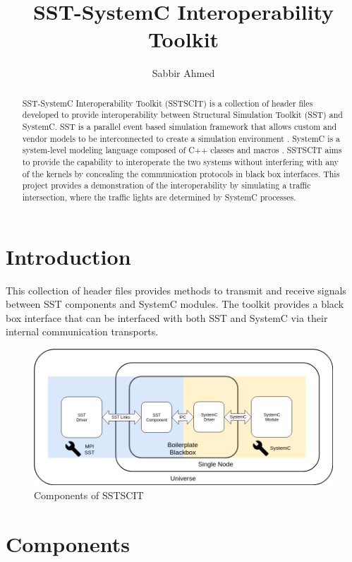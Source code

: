 \documentclass{article}
\title{SST-SystemC Interoperability Toolkit}
\author{
  Sabbir Ahmed
}
\begin{document}
  \maketitle

  \begin{abstract}
    SST-SystemC Interoperability Toolkit (SSTSCIT) is a collection of header files developed to
    provide interoperability between Structural Simulation Toolkit (SST) and SystemC. SST is a
    parallel event based simulation framework that allows custom and vendor models to be
    interconnected to create a simulation environment \cite{sst}. SystemC is a system-level modeling
    language composed of C++ classes and macros \cite{sysc}. SSTSCIT aims to provide the capability
    to interoperate the two systems without interfering with any of the kernels by concealing the
    communication protocols in black box interfaces. This project provides a demonstration of the
    interoperability by simulating a traffic intersection, where the traffic lights are determined
    by SystemC processes.
  \end{abstract}

  \section{Introduction}
  This collection of header files provides methods to transmit and receive signals between SST
  components and SystemC modules. The toolkit provides a black box interface that can be interfaced
  with both SST and SystemC via their internal communication transports. 

  \begin{figure}[!h]
    \centering
    \includegraphics[width=6in]{comm.png}
    \caption{Components of SSTSCIT}
    \label{fig:fig1}
  \end{figure}

  \section{Components} \label{sec:comp}
\end{document}
